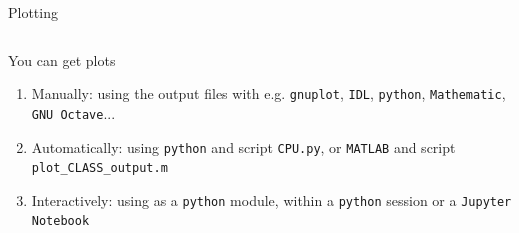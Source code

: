\begin{frame}[fragile]{Plotting}

\begin{columns}
	\begin{block}{You can get plots}
		\begin{enumerate}
			\item{Manually:} using the output files with e.g. {\tt gnuplot}, {\tt IDL}, {\tt python}, {\tt Mathematic}, {\tt GNU Octave}...
			\item{Automatically:} using {\tt \Red python} and script {\tt \Red CPU.py}, or {\tt MATLAB} and script {\tt plot\_CLASS\_output.m}
			\item{Interactively:} using \CLASS{} as a {\tt python} module, within a {\tt python} session or a {\tt \Red Jupyter Notebook}
		\end{enumerate}
	\end{block}
\end{columns}

\end{frame}


